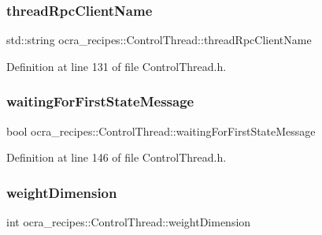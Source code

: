 \subsubsection{\texorpdfstring{thread\+Rpc\+Client\+Name}{threadRpcClientName}}
{\footnotesize\ttfamily std\+::string ocra\+\_\+recipes\+::\+Control\+Thread\+::thread\+Rpc\+Client\+Name\hspace{0.3cm}{\ttfamily [protected]}}



Definition at line 131 of file Control\+Thread.\+h.

\hypertarget{classocra__recipes_1_1ControlThread_aaef2c765c3900ebc72125f7a8fd4240e}{}\label{classocra__recipes_1_1ControlThread_aaef2c765c3900ebc72125f7a8fd4240e} 
\subsubsection{\texorpdfstring{waiting\+For\+First\+State\+Message}{waitingForFirstStateMessage}}
{\footnotesize\ttfamily bool ocra\+\_\+recipes\+::\+Control\+Thread\+::waiting\+For\+First\+State\+Message\hspace{0.3cm}{\ttfamily [protected]}}



Definition at line 146 of file Control\+Thread.\+h.

\hypertarget{classocra__recipes_1_1ControlThread_a7499733b7dd28f8ff0168e206c5b325b}{}\label{classocra__recipes_1_1ControlThread_a7499733b7dd28f8ff0168e206c5b325b} 
\subsubsection{\texorpdfstring{weight\+Dimension}{weightDimension}}
{\footnotesize\ttfamily int ocra\+\_\+recipes\+::\+Control\+Thread\+::weight\+Dimension\hspace{0.3cm}{\ttfamily [protected]}}



